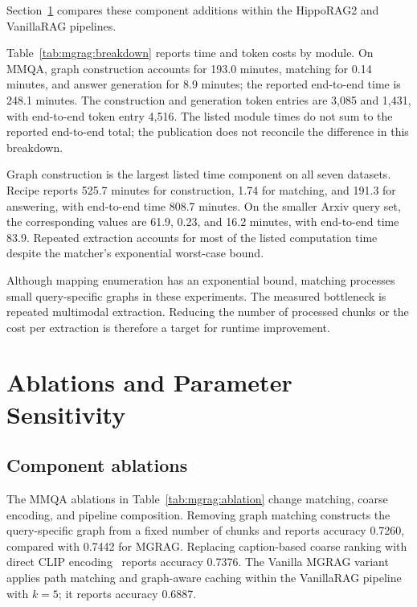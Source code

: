 Section~\ref{sec:mgrag:ablations} compares these component additions within the HippoRAG2 and VanillaRAG pipelines.

Table~\ref{tab:mgrag:breakdown} reports time and token costs by module. On MMQA, graph construction accounts for 193.0 minutes, matching for 0.14 minutes, and answer generation for 8.9 minutes; the reported end-to-end time is 248.1 minutes. The construction and generation token entries are 3,085 and 1,431, with end-to-end token entry 4,516. The listed module times do not sum to the reported end-to-end total; the publication does not reconcile the difference in this breakdown.



Graph construction is the largest listed time component on all seven datasets. Recipe reports 525.7 minutes for construction, 1.74 for matching, and 191.3 for answering, with end-to-end time 808.7 minutes. On the smaller Arxiv query set, the corresponding values are 61.9, 0.23, and 16.2 minutes, with end-to-end time 83.9. Repeated extraction accounts for most of the listed computation time despite the matcher's exponential worst-case bound.

Although mapping enumeration has an exponential bound, matching processes small query-specific graphs in these experiments. The measured bottleneck is repeated multimodal extraction. Reducing the number of processed chunks or the cost per extraction is therefore a target for runtime improvement.

\section{Ablations and Parameter Sensitivity}
\label{sec:mgrag:ablations}

\subsection{Component ablations}

The MMQA ablations in Table~\ref{tab:mgrag:ablation} change matching, coarse encoding, and pipeline composition. Removing graph matching constructs the query-specific graph from a fixed number of chunks and reports accuracy 0.7260, compared with 0.7442 for MGRAG. Replacing caption-based coarse ranking with direct CLIP encoding~\cite{mgrag-radford2021learning} reports accuracy 0.7376. The Vanilla MGRAG variant applies path matching and graph-aware caching within the VanillaRAG pipeline with $k=5$; it reports accuracy 0.6887.

